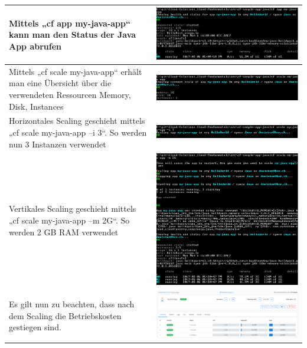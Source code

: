 \begin{longtable}{| p{5cm} | p{11cm} |}
Mittels „cf app my-java-app“ kann man den Status der Java App abrufen &\includegraphics[width=0.65\columnwidth, valign=T]{images/image14.png} \\ \hline
Mittels „cf scale my-java-app“ erhält man eine Übersicht über die verwendeten Ressourcen Memory, Disk, Instances 
&\includegraphics[width=0.65\columnwidth, valign=T]{images/image15.png} \\ \hline
Horizontales Scaling geschieht mittels „cf scale my-java-app –i 3“. So werden nun 3 Instanzen verwendet 
&\includegraphics[width=0.65\columnwidth, valign=T]{images/image16.png} \\ \hline
Vertikales Scaling geschieht mittels „cf scale my-java-app –m 2G“. So werden 2 GB RAM verwendet &\includegraphics[width=0.65\columnwidth, valign=T]{images/image17.png} \\ \hline
Es gilt nun zu beachten, dass nach dem Scaling die Betriebskosten gestiegen sind. &\includegraphics[width=0.65\columnwidth, valign=T]{images/image18.png} \\ \hline

\end{longtable}
